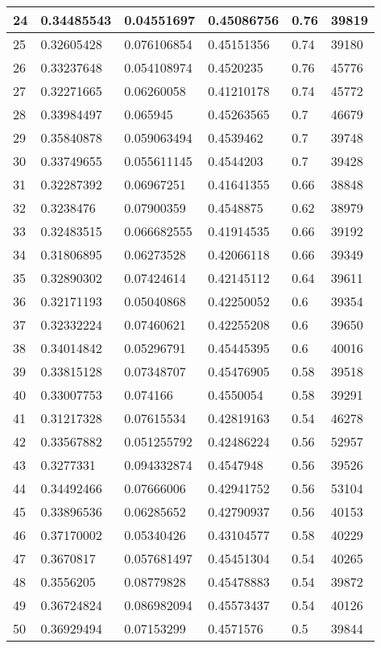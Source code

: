 \begin{longtable}{|l|l|l|l|l|l|}
24 & 0.34485543 & 0.04551697 & 0.45086756 & 0.76 & 39819 \\ \hline 
25 & 0.32605428 & 0.076106854 & 0.45151356 & 0.74 & 39180 \\ \hline 
26 & 0.33237648 & 0.054108974 & 0.4520235 & 0.76 & 45776 \\ \hline 
27 & 0.32271665 & 0.06260058 & 0.41210178 & 0.74 & 45772 \\ \hline 
28 & 0.33984497 & 0.065945 & 0.45263565 & 0.7 & 46679 \\ \hline 
29 & 0.35840878 & 0.059063494 & 0.4539462 & 0.7 & 39748 \\ \hline 
30 & 0.33749655 & 0.055611145 & 0.4544203 & 0.7 & 39428 \\ \hline 
31 & 0.32287392 & 0.06967251 & 0.41641355 & 0.66 & 38848 \\ \hline 
32 & 0.3238476 & 0.07900359 & 0.4548875 & 0.62 & 38979 \\ \hline 
33 & 0.32483515 & 0.066682555 & 0.41914535 & 0.66 & 39192 \\ \hline 
34 & 0.31806895 & 0.06273528 & 0.42066118 & 0.66 & 39349 \\ \hline 
35 & 0.32890302 & 0.07424614 & 0.42145112 & 0.64 & 39611 \\ \hline 
36 & 0.32171193 & 0.05040868 & 0.42250052 & 0.6 & 39354 \\ \hline 
37 & 0.32332224 & 0.07460621 & 0.42255208 & 0.6 & 39650 \\ \hline 
38 & 0.34014842 & 0.05296791 & 0.45445395 & 0.6 & 40016 \\ \hline 
39 & 0.33815128 & 0.07348707 & 0.45476905 & 0.58 & 39518 \\ \hline 
40 & 0.33007753 & 0.074166 & 0.4550054 & 0.58 & 39291 \\ \hline 
41 & 0.31217328 & 0.07615534 & 0.42819163 & 0.54 & 46278 \\ \hline 
42 & 0.33567882 & 0.051255792 & 0.42486224 & 0.56 & 52957 \\ \hline 
43 & 0.3277331 & 0.094332874 & 0.4547948 & 0.56 & 39526 \\ \hline 
44 & 0.34492466 & 0.07666006 & 0.42941752 & 0.56 & 53104 \\ \hline 
45 & 0.33896536 & 0.06285652 & 0.42790937 & 0.56 & 40153 \\ \hline 
46 & 0.37170002 & 0.05340426 & 0.43104577 & 0.58 & 40229 \\ \hline 
47 & 0.3670817 & 0.057681497 & 0.45451304 & 0.54 & 40265 \\ \hline 
48 & 0.3556205 & 0.08779828 & 0.45478883 & 0.54 & 39872 \\ \hline 
49 & 0.36724824 & 0.086982094 & 0.45573437 & 0.54 & 40126 \\ \hline 
50 & 0.36929494 & 0.07153299 & 0.4571576 & 0.5 & 39844 \\ \hline 
\end{longtable}